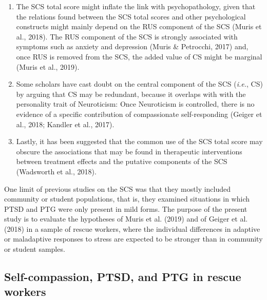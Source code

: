 \documentclass[
  english,
  man,floatsintext]{apa7}
\begin{document}
\begin{enumerate}
\def\labelenumi{\arabic{enumi}.}
\item
  The SCS total score might inflate the link with psychopathology, given that the relations found between the SCS total scores and other psychological constructs might mainly depend on the RUS component of the SCS (Muris et al., 2018). The RUS component of the SCS is strongly associated with symptoms such as anxiety and depression (Muris \& Petrocchi, 2017) and, once RUS is removed from the SCS, the added value of CS might be marginal (Muris et al., 2019).
\item
  Some scholars have cast doubt on the central component of the SCS (\emph{i.e.}, CS) by arguing that CS may be redundant, because it overlaps with with the personality trait of Neuroticism: Once Neuroticism is controlled, there is no evidence of a specific contribution of compassionate self-responding (Geiger et al., 2018; Kandler et al., 2017).
\item
  Lastly, it has been suggested that the common use of the SCS total score may obscure the associations that may be found in therapeutic interventions between treatment effects and the putative components of the SCS (Wadsworth et al., 2018).
\end{enumerate}

One limit of previous studies on the SCS was that they mostly included community or student populations, that is, they examined situations in which PTSD and PTG were only present in mild forms. The purpose of the present study is to evaluate the hypotheses of Muris et al. (2019) and of Geiger et al. (2018) in a sample of rescue workers, where the individual differences in adaptive or maladaptive responses to stress are expected to be stronger than in community or student samples.

\hypertarget{self-compassion-ptsd-and-ptg-in-rescue-workers}{%
\subsection{Self-compassion, PTSD, and PTG in rescue workers}\label{self-compassion-ptsd-and-ptg-in-rescue-workers}}
\end{document}
